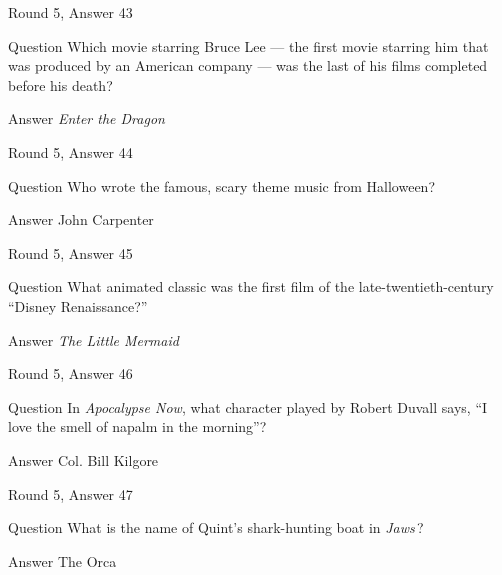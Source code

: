 \documentclass[11pt]{beamer}
\begin{document}
\begin{frame}[t]{Round 5, Answer 43}
\vspace{2em}
\begin{block}{Question}
Which movie starring Bruce Lee — the first movie starring him that was produced by an American company — was the last of his films completed before his death?
\end{block}
\pause{}
\begin{block}{Answer}
\emph{Enter the Dragon}
\end{block}
\end{frame}
    

\begin{frame}[t]{Round 5, Answer 44}
\vspace{2em}
\begin{block}{Question}
Who wrote the famous, scary theme music from Halloween?
\end{block}
\pause{}
\begin{block}{Answer}
John Carpenter
\end{block}
\end{frame}
    

\begin{frame}[t]{Round 5, Answer 45}
\vspace{2em}
\begin{block}{Question}
What animated classic was the first film of the late-twentieth-century ``Disney Renaissance?''
\end{block}
\pause{}
\begin{block}{Answer}
\emph{The Little Mermaid}
\end{block}
\end{frame}
    

\begin{frame}[t]{Round 5, Answer 46}
\vspace{2em}
\begin{block}{Question}
In \emph{Apocalypse Now}, what character played by Robert Duvall says, ``I love the smell of napalm in the morning''?
\end{block}
\pause{}
\begin{block}{Answer}
Col. Bill Kilgore
\end{block}
\end{frame}
    

\begin{frame}[t]{Round 5, Answer 47}
\vspace{2em}
\begin{block}{Question}
What is the name of Quint's shark-hunting boat in \emph{Jaws}\,?
\end{block}
\pause{}
\begin{block}{Answer}
The Orca
\end{block}
\end{frame}
    
\end{document}
